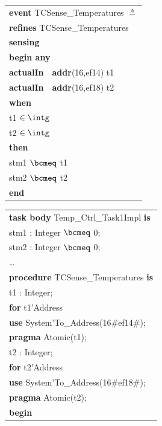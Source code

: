 %
\begin{figure}[b]
\begin{sffamily}
\begin{minipage}{0.45\linewidth}
\begin{center}
\begin{tabular}{l}
\textbf{event} TCSense\_Temperatures $\triangleq$ \\  
\textbf{refines} TCSense\_Temperatures \\
\textbf{sensing} \\
\textbf{begin any} \\ 
\quad \textbf{actualIn}~~\textbf{addr}(16,ef14) t1 \\
\quad \textbf{actualIn}~~\textbf{addr}(16,ef18) t2 \\
\textbf{when} \\
\quad  t1 $\in \intg$ \\
\quad  t2 $\in \intg$ \\
\textbf{then} \\
\quad  stm1 $\bcmeq$ t1 \\
\quad  stm2 $\bcmeq$ t2 \\
\textbf{end} 
\end{tabular}
\end{center}
\end{minipage}
\begin{minipage}{0.5\linewidth}
\begin{center}
\begin{tabular}{l}
\textbf{task body} Temp\_Ctrl\_Task1Impl \textbf{is}    \\
\quad  stm1 : Integer $\bcmeq$ 0; \\
\quad  stm2 : Integer $\bcmeq$ 0; \\
\quad  \ldots \\
\quad  \textbf{procedure} TCSense\_Temperatures \textbf{is} \\
\qquad  t1 : Integer; \\
\qquad  \textbf{for} t1'Address \\
\qquad\quad\textbf{use} System'To\_Address(16\#ef14\#); \\
\qquad\textbf{pragma} Atomic(t1);\\
\qquad  t2 : Integer; \\
\qquad  \textbf{for} t2'Address \\
\qquad\quad \textbf{use} System'To\_Address(16\#ef18\#); \\
\qquad\textbf{pragma} Atomic(t2);\\
\quad  \textbf{begin} \\

\end{tabular}
\end{center}
\end{minipage}
\end{sffamily}
\end{figure}
